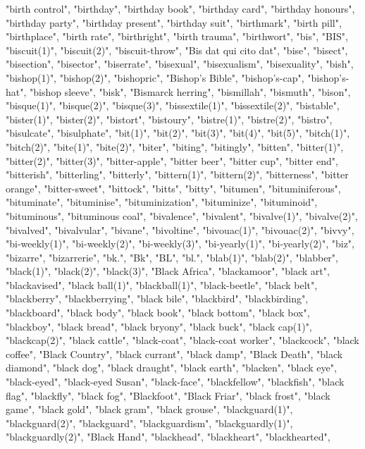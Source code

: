 "birth control",
"birthday",
"birthday book",
"birthday card",
"birthday honours",
"birthday party",
"birthday present",
"birthday suit",
"birthmark",
"birth pill",
"birthplace",
"birth rate",
"birthright",
"birth trauma",
"birthwort",
"bis",
"BIS",
"biscuit(1)",
"biscuit(2)",
"biscuit-throw",
"Bis dat qui cito dat",
"bise",
"bisect",
"bisection",
"bisector",
"biserrate",
"bisexual",
"bisexualism",
"bisexuality",
"bish",
"bishop(1)",
"bishop(2)",
"bishopric",
"Bishop's Bible",
"bishop's-cap",
"bishop's-hat",
"bishop sleeve",
"bisk",
"Bismarck herring",
"bismillah",
"bismuth",
"bison",
"bisque(1)",
"bisque(2)",
"bisque(3)",
"bissextile(1)",
"bissextile(2)",
"bistable",
"bister(1)",
"bister(2)",
"bistort",
"bistoury",
"bistre(1)",
"bistre(2)",
"bistro",
"bisulcate",
"bisulphate",
"bit(1)",
"bit(2)",
"bit(3)",
"bit(4)",
"bit(5)",
"bitch(1)",
"bitch(2)",
"bite(1)",
"bite(2)",
"biter",
"biting",
"bitingly",
"bitten",
"bitter(1)",
"bitter(2)",
"bitter(3)",
"bitter-apple",
"bitter beer",
"bitter cup",
"bitter end",
"bitterish",
"bitterling",
"bitterly",
"bittern(1)",
"bittern(2)",
"bitterness",
"bitter orange",
"bitter-sweet",
"bittock",
"bitts",
"bitty",
"bitumen",
"bituminiferous",
"bituminate",
"bituminise",
"bituminization",
"bituminize",
"bituminoid",
"bituminous",
"bituminous coal",
"bivalence",
"bivalent",
"bivalve(1)",
"bivalve(2)",
"bivalved",
"bivalvular",
"bivane",
"bivoltine",
"bivouac(1)",
"bivouac(2)",
"bivvy",
"bi-weekly(1)",
"bi-weekly(2)",
"bi-weekly(3)",
"bi-yearly(1)",
"bi-yearly(2)",
"biz",
"bizarre",
"bizarrerie",
"bk.",
"Bk",
"BL",
"bl.",
"blab(1)",
"blab(2)",
"blabber",
"black(1)",
"black(2)",
"black(3)",
"Black Africa",
"blackamoor",
"black art",
"blackavised",
"black ball(1)",
"blackball(1)",
"black-beetle",
"black belt",
"blackberry",
"blackberrying",
"black bile",
"blackbird",
"blackbirding",
"blackboard",
"black body",
"black book",
"black bottom",
"black box",
"blackboy",
"black bread",
"black bryony",
"black buck",
"black cap(1)",
"blackcap(2)",
"black cattle",
"black-coat",
"black-coat worker",
"blackcock",
"black coffee",
"Black Country",
"black currant",
"black damp",
"Black Death",
"black diamond",
"black dog",
"black draught",
"black earth",
"blacken",
"black eye",
"black-eyed",
"black-eyed Susan",
"black-face",
"blackfellow",
"blackfish",
"black flag",
"blackfly",
"black fog",
"Blackfoot",
"Black Friar",
"black frost",
"black game",
"black gold",
"black gram",
"black grouse",
"blackguard(1)",
"blackguard(2)",
"blackguard",
"blackguardism",
"blackguardly(1)",
"blackguardly(2)",
"Black Hand",
"blackhead",
"blackheart",
"blackhearted",

